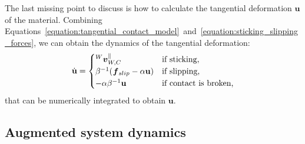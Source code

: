 The last missing point to discuss is how to calculate the tangential deformation $\mathbf{u}$ of the material.
Combining Equations~\eqref{equation:tangential_contact_model}~and~\eqref{equation:sticking_slipping_forces}, we can obtain the dynamics of the tangential deformation:
%
\begin{equation}
    \label{equation:tangential_deformation_dynamics}
    \dot{\mathbf{u}} =
    \begin{cases}
        \vellin[W]^{\parallel}_{W,C} &\text{if sticking,} \\
        \beta^{-1} (\forcelin_{slip} - \alpha \mathbf{u}) &\text{if slipping,} \\
        -\alpha \beta^{-1} \mathbf{u} &\text{if contact is broken,}
    \end{cases}
\end{equation}
%
that can be numerically integrated to obtain $\mathbf{u}$.

\subsection{Augmented system dynamics}

